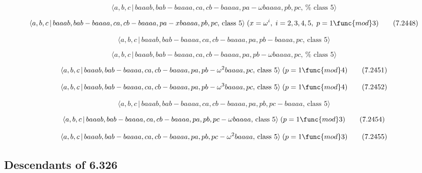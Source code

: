 \documentclass[10pt]{article}
\begin{document}
\begin{equation}
\langle a,b,c\,|\,baaab,bab-baaaa,ca,cb-baaaa,pa-\omega baaaa,pb,pc,\,\text{%
class }5\rangle  \tag{7.2447}
\end{equation}

\begin{equation}
\langle a,b,c\,|\,baaab,bab-baaaa,ca,cb-baaaa,pa-xbaaaa,pb,pc,\,\text{class }%
5\rangle \;(x=\omega ^{i},\;i=2,3,4,5,\;p=1\func{mod}3)  \tag{7.2448}
\end{equation}

\begin{equation}
\langle a,b,c\,|\,baaab,bab-baaaa,ca,cb-baaaa,pa,pb-baaaa,pc,\,\text{class }%
5\rangle  \tag{7.2449}
\end{equation}

\begin{equation}
\langle a,b,c\,|\,baaab,bab-baaaa,ca,cb-baaaa,pa,pb-\omega baaaa,pc,\,\text{%
class }5\rangle  \tag{7.2450}
\end{equation}

\begin{equation}
\langle a,b,c\,|\,baaab,bab-baaaa,ca,cb-baaaa,pa,pb-\omega ^{2}baaaa,pc,\,%
\text{class }5\rangle \;(p=1\func{mod}4)  \tag{7.2451}
\end{equation}

\begin{equation}
\langle a,b,c\,|\,baaab,bab-baaaa,ca,cb-baaaa,pa,pb-\omega ^{3}baaaa,pc,\,%
\text{class }5\rangle \;(p=1\func{mod}4)  \tag{7.2452}
\end{equation}

\begin{equation}
\langle a,b,c\,|\,baaab,bab-baaaa,ca,cb-baaaa,pa,pb,pc-baaaa,\,\text{class }%
5\rangle  \tag{7.2453}
\end{equation}

\begin{equation}
\langle a,b,c\,|\,baaab,bab-baaaa,ca,cb-baaaa,pa,pb,pc-\omega baaaa,\,\text{%
class }5\rangle \;(p=1\func{mod}3)  \tag{7.2454}
\end{equation}

\begin{equation}
\langle a,b,c\,|\,baaab,bab-baaaa,ca,cb-baaaa,pa,pb,pc-\omega ^{2}baaaa,\,%
\text{class }5\rangle \;(p=1\func{mod}3)  \tag{7.2455}
\end{equation}

\subsection{Descendants of 6.326}
\end{document}
